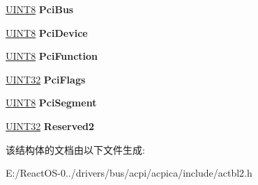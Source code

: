 \begin{DoxyCompactItemize}
\hyperlink{_processor_bind_8h_ab27e9918b538ce9d8ca692479b375b6a}{U\+I\+N\+T8} {\bfseries Pci\+Bus}
\item 
\mbox{\label{structacpi__table__spcr_a52682ac0edaa8bb0930ce9bc2c7d351b}} 
\hyperlink{_processor_bind_8h_ab27e9918b538ce9d8ca692479b375b6a}{U\+I\+N\+T8} {\bfseries Pci\+Device}
\item 
\mbox{\label{structacpi__table__spcr_a95e255775f911f48360287e7f30caed3}} 
\hyperlink{_processor_bind_8h_ab27e9918b538ce9d8ca692479b375b6a}{U\+I\+N\+T8} {\bfseries Pci\+Function}
\item 
\mbox{\label{structacpi__table__spcr_aa742c0d41fd9b38de42f91ff69442514}} 
\hyperlink{_processor_bind_8h_ae1e6edbbc26d6fbc71a90190d0266018}{U\+I\+N\+T32} {\bfseries Pci\+Flags}
\item 
\mbox{\label{structacpi__table__spcr_a53f60871cd85cfb1de53c2f51f8eab10}} 
\hyperlink{_processor_bind_8h_ab27e9918b538ce9d8ca692479b375b6a}{U\+I\+N\+T8} {\bfseries Pci\+Segment}
\item 
\mbox{\label{structacpi__table__spcr_ae2965862679552b739c83dea6b8d5941}} 
\hyperlink{_processor_bind_8h_ae1e6edbbc26d6fbc71a90190d0266018}{U\+I\+N\+T32} {\bfseries Reserved2}
\end{DoxyCompactItemize}


该结构体的文档由以下文件生成\+:\begin{DoxyCompactItemize}
\item 
E\+:/\+React\+O\+S-\/0../drivers/bus/acpi/acpica/include/actbl2.\+h\end{DoxyCompactItemize}
